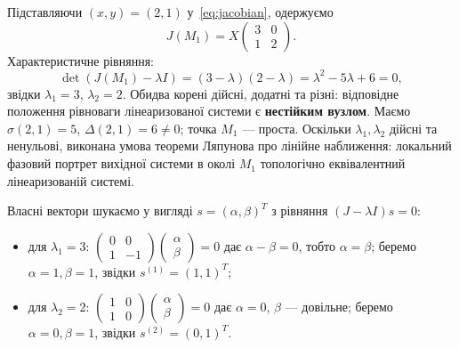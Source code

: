 \documentclass[12pt,a4paper]{article}
\begin{document}
Підставляючи $(x,y)=(2,1)$ у~\eqref{eq:jacobian}, одержуємо
\begin{equation*}
J(M_1)=X
\begin{pmatrix}
3 & 0\\
1 & 2
\end{pmatrix}.
\end{equation*}
Характеристичне рівняння:
\begin{equation*}
\det(J(M_1)-\lambda I)=(3-\lambda)(2-\lambda)=\lambda^2-5\lambda+6=0,
\end{equation*}
звідки $\lambda_1=3$, $\lambda_2=2$.
Обидва корені дійсні, додатні та різні: відповідне положення рівноваги лінеаризованої системи є \textbf{нестійким вузлом}.
Маємо $\sigma(2,1)=5$, $\Delta(2,1)=6\neq 0$; точка $M_1$ --- проста.
Оскільки $\lambda_1,\lambda_2$ дійсні та ненульові, виконана умова теореми Ляпунова про лінійне наближення: локальний фазовий портрет вихідної системи в околі $M_1$ топологічно еквівалентний лінеаризованій системі.

Власні вектори шукаємо у вигляді $s=(\alpha,\beta)^T$ з рівняння $(J-\lambda I)s=0$:
\begin{itemize}
    \item для $\lambda_1=3$: $\begin{pmatrix}0&0\\1&-1\end{pmatrix}\begin{pmatrix}\alpha\\ \beta\end{pmatrix}=0$ дає $\alpha-\beta=0$, тобто $\alpha=\beta$; беремо $\alpha=1,\beta=1$, звідки $s^{(1)}=(1,1)^T$;
    \item для $\lambda_2=2$: $\begin{pmatrix}1&0\\1&0\end{pmatrix}\begin{pmatrix}\alpha\\ \beta\end{pmatrix}=0$ дає $\alpha=0$, $\beta$ --- довільне; беремо $\alpha=0,\beta=1$, звідки $s^{(2)}=(0,1)^T$.
\end{itemize}
\end{document}
